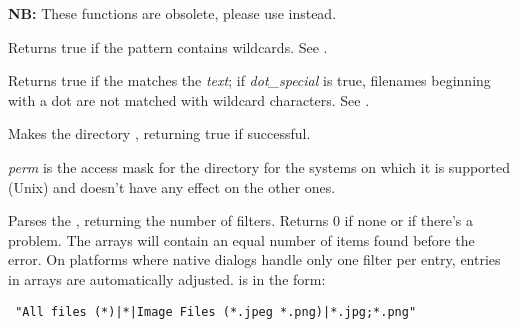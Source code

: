 

{\bf NB:} These functions are obsolete, please use\rtfsp
{}\rtfsp
instead.


\label{wxiswild}


Returns true if the pattern contains wildcards. See .


\label{wxmatchwild}


Returns true if the \/ matches the {\it text}\/; if {\it
dot\_special}\/ is true, filenames beginning with a dot are not matched
with wildcard characters. See .


\label{wxmkdir}


Makes the directory , returning true if successful.

{\it perm} is the access mask for the directory for the systems on which it is
supported (Unix) and doesn't have any effect on the other ones.


\label{wxparsecommondialogsfilter}


Parses the , returning the number of filters.
Returns 0 if none or if there's a problem.
The arrays will contain an equal number of items found before the error.
On platforms where native dialogs handle only one filter per entry,
entries in arrays are automatically adjusted.
 is in the form:
\begin{verbatim}
 "All files (*)|*|Image Files (*.jpeg *.png)|*.jpg;*.png"
\end{verbatim}

